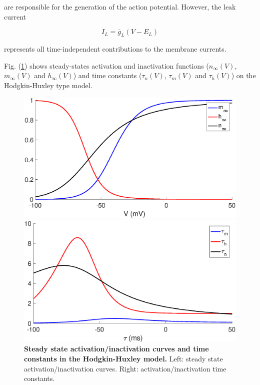 are responsible for the generation of the action potential. However, the leak current

\begin{equation}
    I_{L} = \bar{g}_{L}(V-E_{L})
\end{equation}

represents all time-independent contributions to the membrane currents.

Fig. (\ref{photo1}) shows steady-states activation and inactivation functions ($n_{\infty}(V)$, $m_{\infty}(V)$ and $h_{\infty}(V)$) and time constants ($\tau_{n}(V)$, $\tau_{m}(V)$ and $\tau_{h}(V)$) on the Hodgkin-Huxley type model.

\begin{figure}[h]
  \begin{minipage}{0.5\linewidth}
  \begin{center}
\includegraphics[width=1\linewidth]{Images/photo1_1.eps}
\end{center}
  \end{minipage} 
  \begin{minipage}{0.5\linewidth}
  \begin{center}
\includegraphics[width=1\linewidth]{Images/photo1_2.eps}
\end{center}
  \end{minipage} 
  \caption{\textbf{Steady state activation/inactivation curves and time constants in the Hodgkin-Huxley model.} Left: steady state activation/inactivation curves. Right: activation/inactivation time constants.}
  \label{photo1}
\end{figure}

